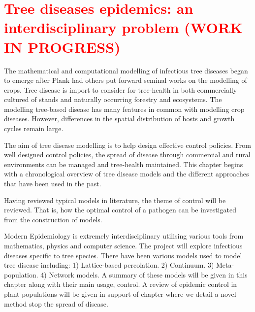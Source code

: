 

\chapter{\textcolor{red}{Tree diseases epidemics: an interdisciplinary problem (WORK IN PROGRESS)}}
\label{chapter2:litreview} 

The mathematical and computational modelling of infectious tree diseases began to emerge after Plank had others put forward seminal works on the modelling of crops. Tree disease is import to consider for tree-health in both commercially cultured of stands and naturally occurring forestry and ecosystems. The modelling tree-based disease has many features in common with modelling crop diseases. However, differences in the spatial distribution of hosts and growth cycles remain large.

The aim of tree disease modelling is to help design effective control policies. From well designed control policies, the spread of disease through commercial and rural environments can be managed and tree-health maintained. This chapter begins with a chronological overview of tree disease models and the different approaches that have been used in the past.

Having reviewed typical models in literature, the theme of control will be reviewed. That is, how the optimal control of a pathogen can be investigated from the construction of models.

Modern Epidemiology is extremely interdisciplinary utilising various tools from mathematics, physics and computer science. The project will explore infectious diseases specific to tree species. There have been various models used to model tree disease including: 1) Lattice-based percolation. 2) Continuum. 3) Meta-population. 4) Network models. A summary of these models will be given in this chapter along with their main usage, control. A review of epidemic control in plant populations will be given in support of chapter where we detail a novel method stop the spread of disease. 


